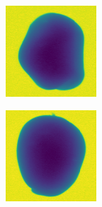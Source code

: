 \documentclass[11pt]{article}
\begin{document}
\begin{figure}[!h]
\begin{subfigure}[b]{0.22\textwidth}
         \caption{}
         \label{fig:perfect_45}
     \end{subfigure}
     \hfill
     \begin{subfigure}[b]{0.22\textwidth}
         \centering
         \includegraphics[width=\textwidth]{figurer/potato_dataset/perfect/perfect_46.jpg}
         \caption{}
         \label{fig:perfect_46}
     \end{subfigure}
     \hfill
     \begin{subfigure}[b]{0.22\textwidth}
         \centering
         \includegraphics[width=\textwidth]{figurer/potato_dataset/perfect/perfect_47.jpg}

\end{subfigure}
\end{figure}
\end{document}
